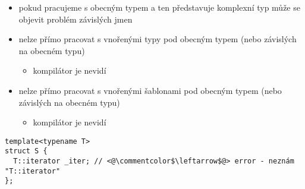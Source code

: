 








\begin{frame}[fragile]
\begin{block}{}
\begin{itemize}
\item pokud pracujeme s obecným typem a ten představuje komplexní typ může se objevit problém závislých jmen
\item nelze přímo pracovat s vnořenými typy pod obecným typem (nebo závislých na obecném typu)
\begin{itemize}
\item kompilátor je nevidí
\end{itemize}
\item nelze přímo pracovat s vnořenými šablonami pod obecným typem (nebo závislých na obecném typu)
\begin{itemize}
\item kompilátor je nevidí
\end{itemize}
\end{itemize}
\end{block}


\begin{noblock}
\begin{lstlisting}
template<typename T>
struct S {
  T::iterator _iter; // <@\commentcolor$\leftarrow$@> error - neznám "T::iterator"
};
\end{lstlisting}
\end{noblock}
\end{frame}

















